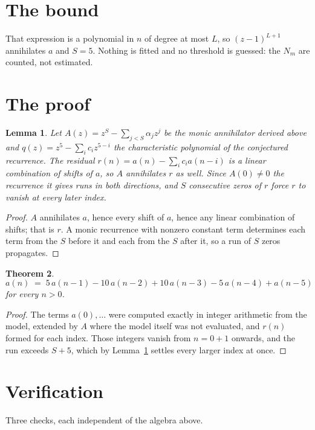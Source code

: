 \documentclass[11pt,a4paper]{article}
\theoremstyle{plain}
\newtheorem{theorem}{Theorem}
\newtheorem{lemma}[theorem]{Lemma}
\theoremstyle{definition}
\begin{document}
\section{The bound}

That expression is a polynomial in $n$ of degree at most $L$, so $(z-1)^{L+1}$ annihilates
$a$ and $S=5$. Nothing is fitted and no threshold is guessed: the $N_m$ are counted, not
estimated.

\section{The proof}

\begin{lemma}\label{lem:crit}
Let $A(z)=z^S-\sum_{j<S}\alpha_jz^{j}$ be the monic annihilator derived above and
$q(z)=z^{5}-\sum_ic_iz^{5-i}$ the characteristic polynomial of the conjectured
recurrence. The residual $r(n)=a(n)-\sum_ic_ia(n-i)$ is a linear combination of shifts of $a$,
so $A$ annihilates $r$ as well. Since $A(0)\ne0$ the recurrence it gives runs in both
directions, and $S$ consecutive zeros of $r$ force $r$ to vanish at every later index.
\end{lemma}

\begin{proof}
$A$ annihilates $a$, hence every shift of $a$, hence any linear combination of shifts; that is
$r$. A monic recurrence with nonzero constant term determines each term from the $S$ before it
and each from the $S$ after it, so a run of $S$ zeros propagates.
\end{proof}

\begin{theorem}
\[
a(n)\;=\;5\,a(n-1) - 10\,a(n-2) + 10\,a(n-3) - 5\,a(n-4) + a(n-5)
\]
for every $n>0$.
\end{theorem}

\begin{proof}
The terms $a(0),\dots$ were computed exactly in integer arithmetic from the model, extended by
$A$ where the model itself was not evaluated, and $r(n)$ formed for each index. Those integers
vanish from $n=0+1$ onwards, and the run exceeds $S+5$, which by
Lemma~\ref{lem:crit} settles every larger index at once.
\end{proof}

\section{Verification}

Three checks, each independent of the algebra above.
\end{document}
